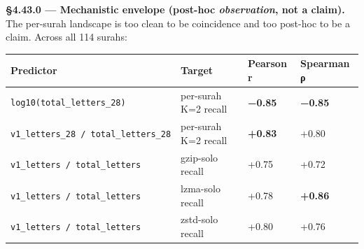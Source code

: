 \documentclass[
]{article}
\newcounter{none} %
\begin{document}
\textbf{§4.43.0 --- Mechanistic envelope (post-hoc \emph{observation},
not a claim).} The per-surah landscape is too clean to be coincidence
and too post-hoc to be a claim. Across all 114 surahs:

{\def\LTcaptype{none} %
\begin{longtable}[]{@{}
  >{\raggedright\arraybackslash}p{}
  >{\raggedright\arraybackslash}p{}
  >{\raggedleft\arraybackslash}p{}
  >{\raggedleft\arraybackslash}p{}@{}}
\toprule\noalign{}
\begin{minipage}[b]{\linewidth}\raggedright
Predictor
\end{minipage} & \begin{minipage}[b]{\linewidth}\raggedright
Target
\end{minipage} & \begin{minipage}[b]{\linewidth}\raggedleft
Pearson r
\end{minipage} & \begin{minipage}[b]{\linewidth}\raggedleft
Spearman ρ
\end{minipage} \\
\midrule\noalign{}
\endhead
\bottomrule\noalign{}
\endlastfoot
\texttt{log10(total\_letters\_28)} & per-surah K=2 recall &
\textbf{−0.85} & \textbf{−0.85} \\
\texttt{v1\_letters\_28\ /\ total\_letters\_28} & per-surah K=2 recall &
\textbf{+0.83} & +0.80 \\
\texttt{v1\_letters\ /\ total\_letters} & gzip-solo recall & +0.75 &
+0.72 \\
\texttt{v1\_letters\ /\ total\_letters} & lzma-solo recall & +0.78 &
\textbf{+0.86} \\
\texttt{v1\_letters\ /\ total\_letters} & zstd-solo recall & +0.80 &
+0.76 \\
\end{longtable}
}
\end{document}
